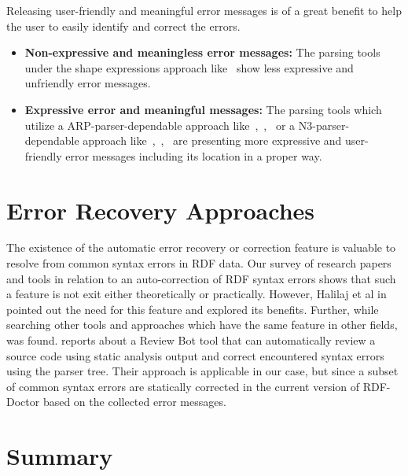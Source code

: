 Releasing user-friendly and meaningful error messages is of a great benefit to help the user to easily identify and correct the errors. 
\begin{itemize}
    \item \textbf{Non-expressive and meaningless error messages:} The parsing tools under the shape expressions approach like~\cite{prud2014shape} show less expressive and unfriendly error messages.
    \item \textbf{Expressive error and meaningful messages:} The parsing tools which utilize a ARP-parser-dependable approach like~\cite{N3Parser:Online},~\cite{Mybluemix:Validation:Online},~\cite{McBride:2002:JSW:613357.613755} or a N3-parser-dependable approach like~\cite{N3Parser:Online},~\cite{IDLab:Validation:Online},~\cite{petersenturtleeditor} are presenting more expressive and user-friendly error messages including its location in a proper way. 
    
\end{itemize}

\section{Error Recovery Approaches}
The existence of the automatic error recovery or correction feature is valuable to resolve from common syntax errors in RDF data.  Our survey of research papers and tools in relation to an auto-correction of RDF syntax errors shows that such a feature is not exit either theoretically or practically. %
However, Halilaj et al in \cite{Git4Voc:article} pointed out the need for this feature and explored its benefits.
Further, while searching other tools and approaches which have the same feature in other fields, \cite{AutoCorrection:Fix-it} was found.  \cite{AutoCorrection:Fix-it} reports about a Review Bot tool that can automatically review a source code using static analysis output and correct encountered syntax errors using the parser tree. Their approach is applicable in our case, but since a subset of common syntax errors are statically corrected in the current version of RDF-Doctor based on the collected error messages.    

\section{Summary}

